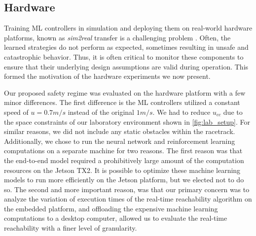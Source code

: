 \documentclass[manuscript,screen,review]{acmart}
\newcommand{\ttj}[1]{\textcolor{red}{\textbf{\underline{TTJ:}} #1}}
\begin{document}
\subsection{Hardware}
Training ML controllers in simulation and deploying them on real-world hardware platforms, known as \textit{sim2real} transfer is a challenging problem \cite{jang2019ICCPS, kadian2019we}. Often, the learned strategies do not perform as expected, sometimes resulting in unsafe and catastrophic behavior. Thus, it is often critical to monitor these components to ensure that their underlying design assumptions are valid during operation. This formed the motivation of the hardware experiments we now present.


Our proposed safety regime was  evaluated on the hardware platform with a few minor differences. The first difference is the ML controllers utilized a constant speed of $u = 0.7  m/s$ instead of the original $1  m/s$. We had to reduce $u_{cc}$ due to the space constraints of our laboratory environment shown in \ref{fig:lab_setup}. For similar reasons, we did not include any static obstacles within the racetrack. %
Additionally, we chose to run the neural network and reinforcement learning computations on a separate machine for two reasons. The first reason was that the end-to-end model required a prohibitively large amount of the computation resources on the Jetson TX2. It is possible to optimize these machine learning models to run more efficiently on the Jetson platform, but we elected not to do so. The second and more important reason, was that our primary concern was to analyze the variation of execution times of the real-time reachability algorithm on the embedded platform, and offloading the expensive machine learning computations to a desktop computer, allowed us to evaluate the real-time reachability with a finer level of granularity.
\end{document}
